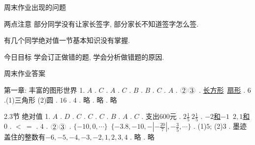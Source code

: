 \documentclass{beamer}
\begin{document}
\kaishu
\begin{frame}{周末作业出现的问题}
  \begin{alertblock}{两点注意}
    部分同学没有让家长签字, 部分家长不知道签字怎么签.\par
    有几个同学绝对值一节基本知识没有掌握.
  \end{alertblock}
  \begin{exampleblock}{今日目标}
    学会订正做错的题, 学会分析做错题的原因.
  \end{exampleblock}
\end{frame}

\begin{frame}{周末作业答案}
  \kaishu
  \begin{block}{第一章: 丰富的图形世界}
    1. $A $ . $C $ . $ A$ . $C $ . $B $ . $B $ . $C $ . $A $ . $\circled2\circled3 $ . \underline{长方形}\  \underline{扇形} . $6 $ .(1)三角形 (2)圆 . $16 $ . $4 $ . 略 . 略 . 略 \quad
  \end{block}
  \begin{exampleblock}{2.3节 绝对值}
    1. $A $ . $D $ . $C $ . $C $ . $C $ . $B $ . $A $ . $C $ . 支出$600 $元 . $2\frac15\ 2\frac15 $ . \underline{$-2$和$-1$}\ \underline{$2,1$和$0$} . $<\ = $ . $4$ . $ \circled2\circled3 $ . $\{-10,0,\cdots\}$\  $\{-3.8,-10,-|-\frac{20}7|,-\frac35,\cdots\} $ . (1)$5$; (2)$3$ . 墨迹盖住的整数有$-6,-5,-4,-3,-2,1,2,3,4 $ . 略 . 略\quad
  \end{exampleblock}
\end{frame}
\end{document}
